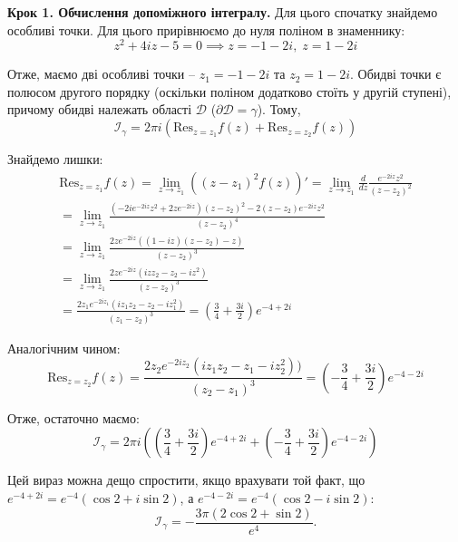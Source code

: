 \documentclass[oneside,solution]{karazin-complan-assign}
\begin{document}
\textbf{Крок 1. Обчислення допоміжного інтегралу.} Для цього спочатку знайдемо особливі точки. Для цього прирівнюємо до нуля поліном в знаменнику:
\begin{equation}
    z^2 + 4iz - 5 = 0 \implies z = -1 - 2i, \; z = 1-2i
\end{equation}

Отже, маємо дві особливі точки -- $z_1=-1-2i$ та $z_2=1-2i$. Обидві точки є полюсом другого порядку (оскільки поліном додатково стоїть у другій ступені), причому обидві належать області $\mathcal{D}$ ($\partial\mathcal{D} = \gamma$). Тому,
\begin{equation}
    \mathcal{I}_{\gamma} = 2\pi i (\text{Res}_{z=z_1}f(z) + \text{Res}_{z=z_2}f(z))
\end{equation}

Знайдемо лишки:
\begin{gather}
    \text{Res}_{z=z_1}f(z) = \lim_{z \to z_1} ((z-z_1)^2 f(z))' = \lim_{z \to z_1} \frac{d}{dz}\frac{e^{-2iz}z^2}{(z-z_2)^2} \nonumber \\ 
    = \lim_{z \to z_1} \frac{(-2ie^{-2iz}z^2 + 2ze^{-2iz})(z-z_2)^2 - 2(z-z_2)e^{-2iz}z^2}{(z-z_2)^4} \nonumber \\
    = \lim_{z \to z_1}\frac{2ze^{-2iz}\left((1-iz)(z-z_2) - z\right)}{(z-z_2)^3} \nonumber \\
    = \lim_{z \to z_1} \frac{2ze^{-2iz}(izz_2-z_2-iz^2)}{(z-z_2)^3} \nonumber \\
    = \frac{2z_1e^{-2iz_1}(iz_1z_2-z_2-iz_1^2)}{(z_1-z_2)^3} = \left(\frac{3}{4}+\frac{3i}{2}\right)e^{-4+2i}
\end{gather}

Аналогічним чином:
\begin{equation}
    \text{Res}_{z=z_2}f(z) = \frac{2z_2e^{-2iz_2}(iz_1z_2 - z_1 - iz_2^2))}{(z_2-z_1)^3} = \left(-\frac{3}{4}+\frac{3i}{2}\right)e^{-4-2i}
\end{equation}

Отже, остаточно маємо:
\begin{equation}
    \mathcal{I}_{\gamma} = 2\pi i \left(\left(\frac{3}{4}+\frac{3i}{2}\right)e^{-4+2i} + \left(-\frac{3}{4}+\frac{3i}{2}\right)e^{-4-2i}\right)
\end{equation}

Цей вираз можна дещо спростити, якщо врахувати той факт, що $e^{-4+2i}=e^{-4}(\cos 2 + i \sin 2)$, а $e^{-4-2i}=e^{-4}(\cos 2 - i \sin 2)$:
\begin{equation}
    \mathcal{I}_{\gamma} = -\frac{3\pi(2 \cos 2 + \sin 2)}{e^4}.
\end{equation}
\end{document}
